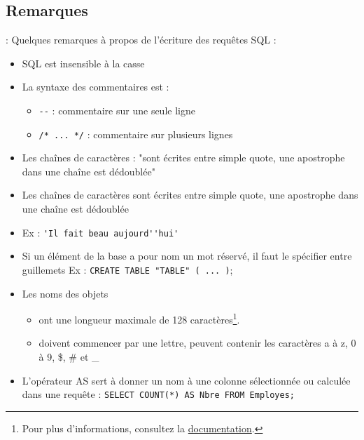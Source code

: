 \documentclass[10pt]{beamer}
\begin{document}
\subsection{Remarques}
\begin{frame}[allowframebreaks]{\secname : \subsecname}
    Quelques remarques à propos de l'écriture des requêtes SQL :
    \begin{itemize}
        \item SQL est insensible à la casse
        \item La syntaxe des commentaires est :
              \begin{itemize}
                  \item  \lstinline[language=plsql]!--! : commentaire sur une seule ligne
                  \item  \lstinline[language=plsql]!/* ... */! : commentaire sur plusieurs lignes
              \end{itemize}
        \item Les chaînes de caractères : "sont écrites entre simple quote, une apostrophe dans une chaîne est dédoublée"
        \item Les chaînes de caractères sont écrites entre simple quote, une apostrophe dans une chaîne est dédoublée
        \item Ex : \lstinline[language=plsql]!'Il fait beau aujourd''hui'!
        \item  Si un élément de la base a pour nom un mot réservé, il faut le spécifier entre guillemets
              Ex : \lstinline[language=plsql]!CREATE TABLE "TABLE" ( ... )!;
        \item Les noms des objets
              \begin{itemize}
                  \item ont une longueur maximale de 128 caractères\footnote{Pour plus d'informations, consultez la \href{https://docs.oracle.com/en/database/oracle/oracle-database/12.2/refrn/ALL_OBJECTS.html\#GUID-AA6DEF8B-F04F-482A-8440-DBCB18F6C976}{documentation}.}.
                  \item doivent commencer par une lettre, peuvent contenir les caractères a à z, 0 à 9, \$, \# et \_
              \end{itemize}
        \item L'opérateur AS sert à donner un nom à une colonne sélectionnée ou calculée dans une requête : \lstinline[language=plsql]!SELECT COUNT(*) AS Nbre FROM Employes;!
    \end{itemize}
\end{frame}
\end{document}
